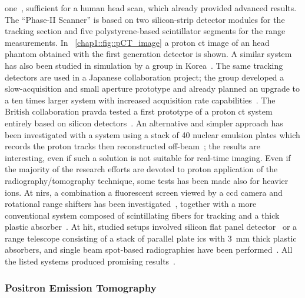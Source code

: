 one~\parencite{Johnson2016}, sufficient for a human head scan, which already provided advanced results. The \enquote{Phase-II Scanner} is based on two silicon-strip detector modules for the tracking section and five polystyrene-based scintillator segments for the range measurements. In \figurename~\ref{chap1::fig::pCT_image} a proton \gls{ct} image of an head phantom obtained with the first generation detector is shown. A similar system has also been studied in simulation by a group in Korea~\parencite{Lee2016}. The same tracking detectors are used in a Japanese collaboration project; the group developed a slow-acquisition and small aperture prototype and already planned an upgrade to a ten times larger system with increased acquisition rate capabilities~\parencite{Saraya2014}. The British collaboration \gls{pravda} tested a first prototype of a proton \gls{ct} system entirely based on silicon detectors~\parencite{Taylor2014, Taylor2016}. An alternative and simpler approach has been investigated with a system using a stack of 40 nuclear emulsion plates which records the proton tracks then reconstructed off-beam~\parencite{Braccini2010b}; the results are interesting, even if such a solution is not suitable for real-time imaging.   
Even if the majority of the research efforts are devoted to proton application of the radiography/tomography technique, some tests has been made also for heavier ions. At \gls{nirs}, a combination a fluorescent screen viewed by a \gls{ccd} camera and rotational range shifters has been investigated~\parencite{Abe2002}, together with a more conventional system composed of scintillating fibers for tracking and a thick plastic absorber~\parencite{Shinoda2006}. At \gls{hit}, studied setups involved silicon flat panel detector~\parencite{Telsemeyer2012} or a range telescope consisting of a stack of parallel plate \glspl{ic} with 3~mm thick plastic absorbers, and single beam spot-based radiographies have been performed~\parencite{Rinaldi2013}. All the listed systems produced promising results~\parencite{Parodi2014}.
    
\subsubsection{Positron Emission Tomography}\label{chap1::subsubsec::RangePET}

